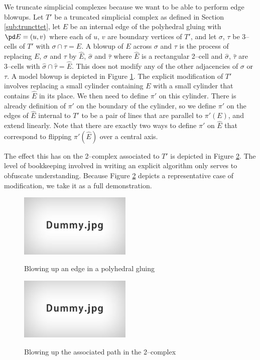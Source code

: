 We truncate simplicial complexes because we want to be able to perform edge blowups.
Let $T'$ be a truncated simplicial complex as defined in Section \ref{sub:truncttet}, let $E$ be an internal edge of the polyhedral gluing with $\pd E=(u,v)$ where each of $u$, $v$ are boundary vertices of $T'$, and let $\sigma$, $\tau$ be 3--cells of $T'$ with $\sigma\cap\tau=E$.
A blowup of $E$ across $\sigma$ and $\tau$ is the process of replacing $E$, $\sigma$ and $\tau$ by $\hat{E}$, $\hat{\sigma}$ and $\hat{\tau}$ where $\hat{E}$ is a rectangular 2--cell and $\hat{\sigma}$, $\hat{\tau}$ are 3--cells with $\hat{\sigma}\cap\hat{\tau}=\hat{E}$.
This does not modify any of the other adjacencies of $\sigma$ or $\tau$.
A model blowup is depicted in Figure \ref{fig:edgeblowup}.
The explicit modification of $T'$ involves replacing a small cylinder containing $E$ with a small cylinder that contains $\hat{E}$ in its place.
We then need to define $\pi'$ on this cylinder.
There is already definition of $\pi'$ on the boundary of the cylinder, so we define $\pi'$ on the edges of $\hat{E}$ internal to $T'$ to be a pair of lines that are parallel to $\pi'(E)$, and extend linearly.
Note that there are exactly two ways to define $\pi'$ on $\hat{E}$ that correspond to flipping $\pi'(\hat{E})$ over a central axis.

The effect this has on the 2--complex associated to $T'$ is depicted in Figure \ref{fig:edgeblowup2complex}.
The level of bookkeeping involved in writing an explicit algorithm only serves to obfuscate understanding.
Because Figure \ref{fig:edgeblowup2complex} depicts a representative case of modification, we take it as a full demonstration.

\begin{figure}
	\centering
	\captionsetup{justification=centering}
	\caption{Blowing up an edge in a polyhedral gluing}
	\includegraphics[height=3cm]{figures/dummy.jpg}
	\label{fig:edgeblowup}
\end{figure}

\begin{figure}
	\centering
	\captionsetup{justification=centering}
	\caption{Blowing up the associated path in the 2--complex}
	\includegraphics[height=3cm]{figures/dummy.jpg}
	\label{fig:edgeblowup2complex}
\end{figure}